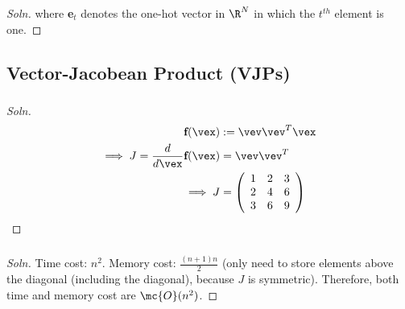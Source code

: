\documentclass{article}
\begin{document}
\begin{proof}[Soln]
		where \textbf{e}$_t$ denotes the one-hot vector in $\R^N$ in which the $t^{th}$ element is one.
	\end{proof}
	\subsection{Vector-Jacobean Product (VJPs)}
	\subsubsection{}
	\begin{proof}[Soln]
		\begin{align}
			\textbf{f}(\vex) &:= \vev \vev^T \vex \\
			\implies J = \frac{d}{d\vex} \textbf{f}(\vex) &= \vev \vev^T \\
			\implies J &=
			\left(
			\begin{array}{ccc}
			 1 & 2 & 3 \\
			 2 & 4 & 6 \\
			 3 & 6 & 9 \\
			\end{array}
			\right)
		\end{align}
	\end{proof}
	
	\subsubsection{}
	\begin{proof}[Soln] Time cost: $n^2$. Memory cost: $\frac{(n+1)n}{2}$ (only need to store elements above the diagonal (including the diagonal), because $J$ is symmetric). Therefore, both time and memory cost are $\mc{O}(n^2)$.
	\end{proof}
\end{document}
